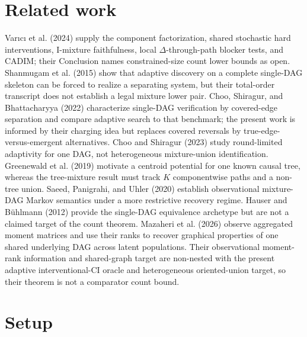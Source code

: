 \documentclass{article}
\begin{document}
\section{Related work}

Varıcı et al. (2024) supply the component factorization, shared stochastic hard interventions, I-mixture faithfulness, local \(\Delta\)-through-path blocker tests, and CADIM; their Conclusion names constrained-size count lower bounds as open. Shanmugam et al. (2015) show that adaptive discovery on a complete single-DAG skeleton can be forced to realize a separating system, but their total-order transcript does not establish a legal mixture lower pair. Choo, Shiragur, and Bhattacharyya (2022) characterize single-DAG verification by covered-edge separation and compare adaptive search to that benchmark; the present work is informed by their charging idea but replaces covered reversals by true-edge-versus-emergent alternatives. Choo and Shiragur (2023) study round-limited adaptivity for one DAG, not heterogeneous mixture-union identification. Greenewald et al. (2019) motivate a centroid potential for one known causal tree, whereas the tree-mixture result must track \(K\) componentwise paths and a non-tree union. Saeed, Panigrahi, and Uhler (2020) establish observational mixture-DAG Markov semantics under a more restrictive recovery regime. Hauser and Bühlmann (2012) provide the single-DAG equivalence archetype but are not a claimed target of the count theorem. Mazaheri et al. (2026) observe aggregated moment matrices and use their ranks to recover graphical properties of one shared underlying DAG across latent populations. Their observational moment-rank information and shared-graph target are non-nested with the present adaptive interventional-CI oracle and heterogeneous oriented-union target, so their theorem is not a comparator count bound.

\section{Setup}
\end{document}
